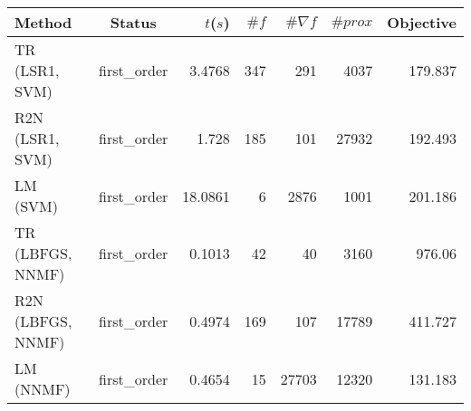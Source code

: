 \begin{tabular}{lcrrrrr}
  \hline
  \textbf{Method} & \textbf{Status} & \textbf{$t$($s$)} & \textbf{$\#f$} & \textbf{$\#\nabla f$} & \textbf{$\#prox$} & \textbf{Objective} \\\hline
  TR (LSR1, SVM) & first\_order & 3.4768 & 347 & 291 & 4037 & 179.837 \\
  R2N (LSR1, SVM) & first\_order & 1.728 & 185 & 101 & 27932 & 192.493 \\
  LM (SVM) & first\_order & 18.0861 & 6 & 2876 & 1001 & 201.186 \\
  \hline
  TR (LBFGS, NNMF) & first\_order & 0.1013 & 42 & 40 & 3160 & 976.06 \\
  R2N (LBFGS, NNMF) & first\_order & 0.4974 & 169 & 107 & 17789 & 411.727 \\
  LM (NNMF) & first\_order & 0.4654 & 15 & 27703 & 12320 & 131.183 \\\hline
\end{tabular}
